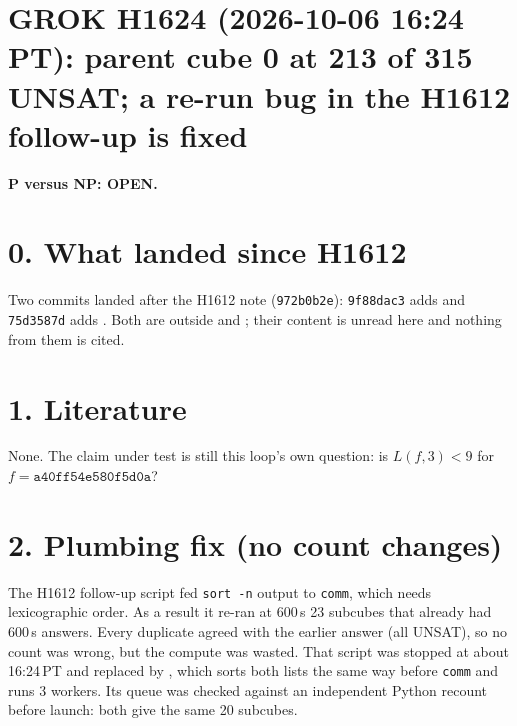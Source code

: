 \documentclass[11pt]{article}
\begin{document}
\sloppy
\section*{GROK H1624 (2026-10-06 16:24 PT): parent cube 0 at 213 of 315 UNSAT; a re-run bug in the H1612 follow-up is fixed}
\textbf{P versus NP: OPEN.}

\section*{0. What landed since H1612}
Two commits landed after the H1612 note (\texttt{972b0b2e}): \texttt{9f88dac3} adds  and \texttt{75d3587d} adds . Both are outside  and ; their content is unread here and nothing from them is cited.

\section*{1. Literature}
None. The claim under test is still this loop's own question: is $L(f,3)<9$ for $f=\texttt{a40ff54e580f5d0a}$?

\section*{2. Plumbing fix (no count changes)}
The H1612 follow-up script fed \texttt{sort -n} output to \texttt{comm}, which needs lexicographic order. As a result it re-ran at 600\,s 23 subcubes that already had 600\,s answers. Every duplicate agreed with the earlier answer (all UNSAT), so no count was wrong, but the compute was wasted. That script was stopped at about 16:24\,PT and replaced by , which sorts both lists the same way before \texttt{comm} and runs 3 workers. Its queue was checked against an independent Python recount before launch: both give the same 20 subcubes.
\end{document}
